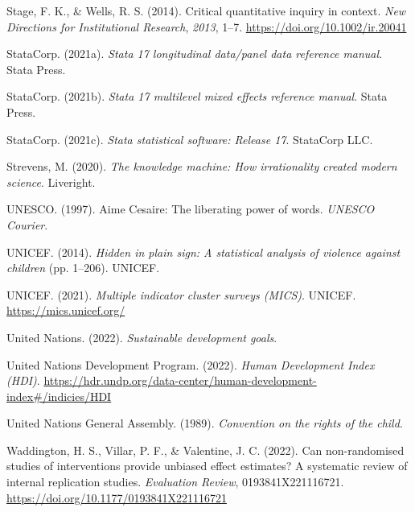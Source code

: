 \documentclass[
  letterpaper,
  DIV=11,
  numbers=noendperiod]{scrreprt}
\newlength{\cslhangindent}
\newlength{\cslentryspacingunit} %
\newenvironment{CSLReferences}[2] %
 {%
  \setlength{\parindent}{0pt}
  \ifodd #1
  \let\oldpar\par
  \def\par{\hangindent=\cslhangindent\oldpar}
  \fi
  \setlength{\parskip}{#2\cslentryspacingunit}
 }%
 {}
\begin{document}
\begin{CSLReferences}{1}{0}
\leavevmode{}%
Stage, F. K., \& Wells, R. S. (2014). Critical quantitative inquiry in
context. \emph{New Directions for Institutional Research}, \emph{2013},
1--7. \url{https://doi.org/10.1002/ir.20041}

\leavevmode{}%
StataCorp. (2021a). \emph{Stata 17 longitudinal data/panel data
reference manual}. Stata Press.

\leavevmode{}%
StataCorp. (2021b). \emph{Stata 17 multilevel mixed effects reference
manual}. Stata Press.

\leavevmode{}%
StataCorp. (2021c). \emph{Stata statistical software: Release 17}.
StataCorp LLC.

\leavevmode{}%
Strevens, M. (2020). \emph{The knowledge machine: How irrationality
created modern science}. Liveright.

\leavevmode{}%
UNESCO. (1997). {A}ime {C}esaire: The liberating power of words.
\emph{UNESCO Courier}.

\leavevmode{}%
UNICEF. (2014). \emph{Hidden in plain sign: A statistical analysis of
violence against children} (pp. 1--206). UNICEF.

\leavevmode{}%
UNICEF. (2021). \emph{Multiple indicator cluster surveys (MICS)}.
UNICEF. \url{https://mics.unicef.org/}

\leavevmode{}%
United Nations. (2022). \emph{Sustainable development goals}.

\leavevmode{}%
United Nations Development Program. (2022). \emph{{Human Development
Index (HDI)}}.
\url{https://hdr.undp.org/data-center/human-development-index\#/indicies/HDI}

\leavevmode{}%
United Nations General Assembly. (1989). \emph{Convention on the rights
of the child}.

\leavevmode{}%
Waddington, H. S., Villar, P. F., \& Valentine, J. C. (2022). Can
non-randomised studies of interventions provide unbiased effect
estimates? A systematic review of internal replication studies.
\emph{Evaluation Review}, 0193841X221116721.
\url{https://doi.org/10.1177/0193841X221116721}


\end{CSLReferences}
\end{document}
